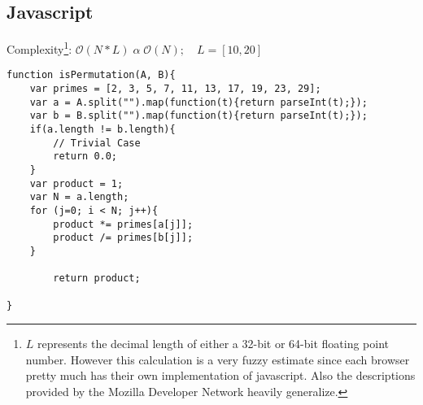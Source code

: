 \documentclass[]{article}
\begin{document}
\subsection*{Javascript}
Complexity\footnote{$L$ represents the decimal length of either a 32-bit or 64-bit floating point number. However this calculation is a very fuzzy estimate since each browser pretty much has their own implementation of javascript. Also the descriptions provided by the Mozilla Developer Network heavily generalize.}: $\mathcal{O}(N*L) \; \alpha \; \mathcal{O}(N);\quad L=[10, 20]$
\begin{lstlisting}
function isPermutation(A, B){
	var primes = [2, 3, 5, 7, 11, 13, 17, 19, 23, 29];
	var a = A.split("").map(function(t){return parseInt(t);});
	var b = B.split("").map(function(t){return parseInt(t);});
	if(a.length != b.length){
		// Trivial Case
		return 0.0;
	}
	var product = 1;
	var N = a.length;
	for (j=0; i < N; j++){
		product *= primes[a[j]];
		product /= primes[b[j]];
	}

		return product;

}

\end{lstlisting}
\end{document}
